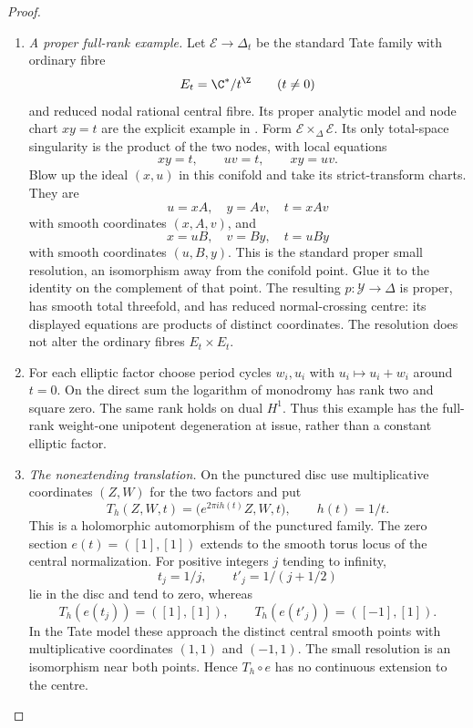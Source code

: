 \begin{proof}
\begin{enumerate}[label=\arabic*.,leftmargin=*]
\item \emph{A proper full-rank example.}
Let $\mathcal E\to\Delta_t$ be the standard Tate
family with ordinary fibre
\[
 E_t=\C^*/t^{\Z}\qquad(t\ne0)
\]
and reduced nodal rational central fibre. Its
proper analytic model and node chart $xy=t$
are the explicit example in
\citet[Sections 1.1.1--1.1.3, pp.~73--74]{KKN2008Root}.
Form $\mathcal E\times_{\Delta}\mathcal E$.
Its only total-space singularity is the product
of the two nodes, with local equations
\[
 xy=t,\qquad uv=t,\qquad xy=uv.
\]
Blow up the ideal $(x,u)$ in this conifold and
take its strict-transform charts. They are
\[
 u=xA,\quad y=Av,\quad t=xAv
\]
with smooth coordinates $(x,A,v)$, and
\[
 x=uB,\quad v=By,\quad t=uBy
\]
with smooth coordinates $(u,B,y)$. This is the
standard proper small resolution, an isomorphism
away from the conifold point. Glue it to the
identity on the complement of that point. The
resulting $p:\mathcal Y\to\Delta$ is proper,
has smooth total threefold, and has reduced
normal-crossing centre: its displayed equations
are products of distinct coordinates. The
resolution does not alter the ordinary fibres
$E_t\times E_t$.

\item For each elliptic factor choose period cycles
$w_i,u_i$ with $u_i\mapsto u_i+w_i$ around
$t=0$. On the direct sum the logarithm of
monodromy has rank two and square zero.
The same rank holds on dual $H^1$. Thus this
example has the full-rank weight-one
unipotent degeneration at issue, rather than
a constant elliptic factor.

\item \emph{The nonextending translation.}
On the punctured disc use multiplicative
coordinates $(Z,W)$ for the two factors and put
\[
 T_h(Z,W,t)=\bigl(e^{2\pi i h(t)}Z,W,t\bigr),
 \qquad h(t)=1/t.
 \tag{B.4.29.1}
\]
This is a holomorphic automorphism of the
punctured family. The zero section
$e(t)=([1],[1])$ extends to the smooth torus
locus of the central normalization. For
positive integers $j$ tending to infinity,
\[
 t_j=1/j,\qquad t'_j=1/(j+1/2)
\]
lie in the disc and tend to zero, whereas
\[
 T_h(e(t_j))=([1],[1]),\qquad
 T_h(e(t'_j))=([-1],[1]).
\]
In the Tate model these approach the distinct
central smooth points with multiplicative
coordinates $(1,1)$ and $(-1,1)$.
The small resolution is an isomorphism near
both points. Hence $T_h\circ e$ has no
continuous extension to the centre.


\end{enumerate}
\end{proof}
